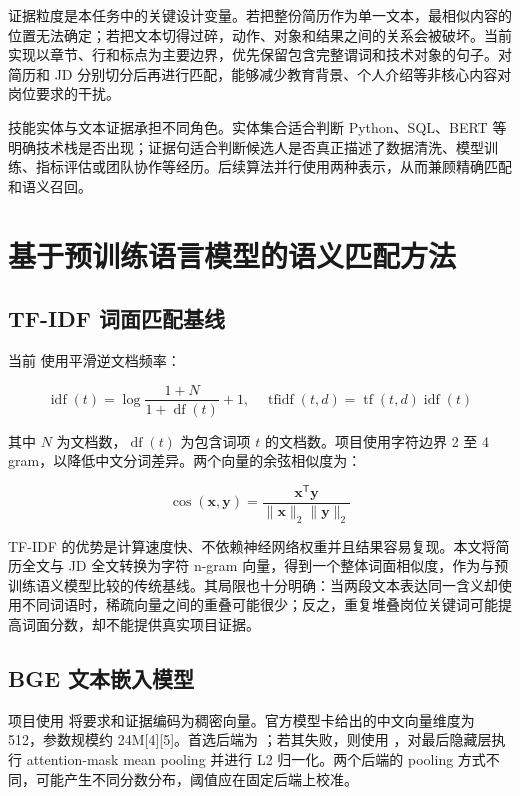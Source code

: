 \documentclass[UTF8,zihao=-4,a4paper,oneside]{ctexrep}
\begin{document}
证据粒度是本任务中的关键设计变量。若把整份简历作为单一文本，最相似内容的位置无法确定；若把文本切得过碎，动作、对象和结果之间的关系会被破坏。当前实现以章节、行和标点为主要边界，优先保留包含完整谓词和技术对象的句子。对简历和 JD 分别切分后再进行匹配，能够减少教育背景、个人介绍等非核心内容对岗位要求的干扰。


技能实体与文本证据承担不同角色。实体集合适合判断 Python、SQL、BERT 等明确技术栈是否出现；证据句适合判断候选人是否真正描述了数据清洗、模型训练、指标评估或团队协作等经历。后续算法并行使用两种表示，从而兼顾精确匹配和语义召回。


\chapter{基于预训练语言模型的语义匹配方法}


\section{TF-IDF 词面匹配基线}


当前 \texttt{} 使用平滑逆文档频率：


\begin{equation}
\operatorname{idf}(t)=\log\frac{1+N}{1+\operatorname{df}(t)}+1,
\quad
\operatorname{tfidf}(t,d)=\operatorname{tf}(t,d)\operatorname{idf}(t)
\end{equation}


其中 \(N\) 为文档数，\(\operatorname{df}(t)\) 为包含词项 \(t\) 的文档数。项目使用字符边界 2 至 4 gram，以降低中文分词差异。两个向量的余弦相似度为：


\begin{equation}
\cos(\boldsymbol{x},\boldsymbol{y})=
\frac{\boldsymbol{x}^{\mathsf T}\boldsymbol{y}}
{\lVert\boldsymbol{x}\rVert_2\lVert\boldsymbol{y}\rVert_2}
\end{equation}


TF-IDF 的优势是计算速度快、不依赖神经网络权重并且结果容易复现。本文将简历全文与 JD 全文转换为字符 n-gram 向量，得到一个整体词面相似度，作为与预训练语义模型比较的传统基线。其局限也十分明确：当两段文本表达同一含义却使用不同词语时，稀疏向量之间的重叠可能很少；反之，重复堆叠岗位关键词可能提高词面分数，却不能提供真实项目证据。


\section{BGE 文本嵌入模型}


项目使用 \texttt{} 将要求和证据编码为稠密向量。官方模型卡给出的中文向量维度为 512，参数规模约 24M[4][5]。首选后端为 \texttt{}；若其失败，则使用 \texttt{}，对最后隐藏层执行 attention-mask mean pooling 并进行 L2 归一化。两个后端的 pooling 方式不同，可能产生不同分数分布，阈值应在固定后端上校准。
\end{document}
